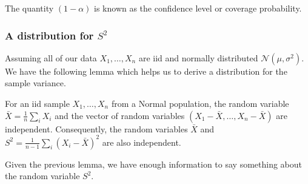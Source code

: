 \documentclass[10pt, a4paper]{article}
\begin{document}
The quantity $(1 - \alpha)$ is known as the confidence level or coverage probability.

\subsubsection{A distribution for \texorpdfstring{$S ^ 2$}{}}
Assuming all of our data $X_1, \dotsc, X_n$ are iid and normally distributed $\mathcal{N}(\mu, \sigma ^ 2)$.
We have the following lemma which helps us to derive a distribution for the sample variance.

\begin{lemma}
    For an iid sample $X_1, \dotsc, X_n$ from a Normal population,
    the random variable $\bar{X} = \frac{1}{n}\sum_{i}X_i$ and the vector of random variables $(X_1 - \bar{X}, \dotsc, X_n - \bar{X})$ are independent.
    Consequently,
    the random variables $\bar{X}$ and $S ^ 2 = \frac{1}{n - 1}\sum_{i}(X_i - \bar{X}) ^ 2$ are also independent.
\end{lemma}

Given the previous lemma,
we have enough information to say something about the random variable $S ^ 2$.
\end{document}
